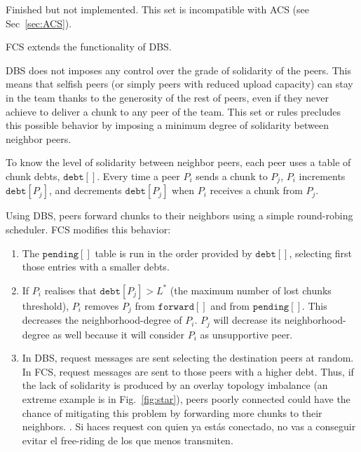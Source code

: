 
\label{sec:FCS}


\begin{notex}
  Finished but not implemented. This set is incompatible with ACS (see Sec~\ref{sec:ACS}).
\end{notex}

FCS extends the functionality of DBS.

DBS does not imposes any control over the grade of solidarity of the
peers. This means that selfish peers (or simply peers with reduced
upload capacity) can stay in the team thanks to the generosity of the
rest of peers, even if they never achieve to deliver a chunk to any
peer of the team. This set or rules precludes this possible behavior
by imposing a minimum degree of solidarity between neighbor peers.

To know the level of solidarity between neighbor peers, each peer uses
a table of chunk debts, $\mathtt{debt}[]$. Every time a peer $P_i$
sends a chunk to $P_j$, $P_i$ increments $\mathtt{debt}[P_j]$, and
decrements $\mathtt{debt}[P_j]$ when $P_i$ receives a chunk from
$P_j$. 

Using DBS, peers forward chunks to their neighbors using a simple
round-robing scheduler. FCS modifies this behavior:
\begin{enumerate}
\item The $\mathtt{pending}[]$ table is run in the order provided by
  $\mathtt{debt}[]$, selecting first those entries with a smaller
  debts.
\item If $P_i$ realises that $\mathtt{debt}[P_j]>L^*$ (the maximum
  number of lost chunks threshold), $P_i$ removes $P_j$ from
  $\mathtt{forward}[]$ and from $\mathtt{pending}[]$. This decreases
  the \gls{neighborhood-degree} of $P_i$. $P_j$ will decrease its
  \gls{neighborhood-degree} as well because it will consider $P_i$ as
  unsupportive peer.
\item In DBS, request messages are sent selecting the destination
  peers at random. In FCS, request messages are sent to those peers
  with a higher debt. Thus, if the lack of solidarity is produced by
  an overlay topology imbalance (an extreme example is in
  Fig.~\ref{fig:star}), peers poorly connected could have the chance
  of mitigating this problem by forwarding more chunks to their
  neighbors. . {\color{red} Si haces
    request con quien ya estás conectado, no vas a conseguir evitar el
    free-riding de los que menos transmiten}.
\end{enumerate}

